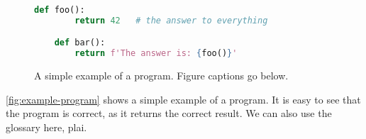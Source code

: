 \begin{figure}[t]
    \begin{lstlisting}[language=Python, gobble=4]
    def foo():
        return 42   # the answer to everything

    def bar():
        return f'The answer is: {foo()}'
    \end{lstlisting}
    \caption{A simple example of a program. Figure captions go below.}
    \label{fig:example-program}
\end{figure}

\autoref{fig:example-program} shows a simple example of a program.
It is easy to see that the program is correct, as it returns the correct result.
We can also use the glossary here, \gls{plai}.